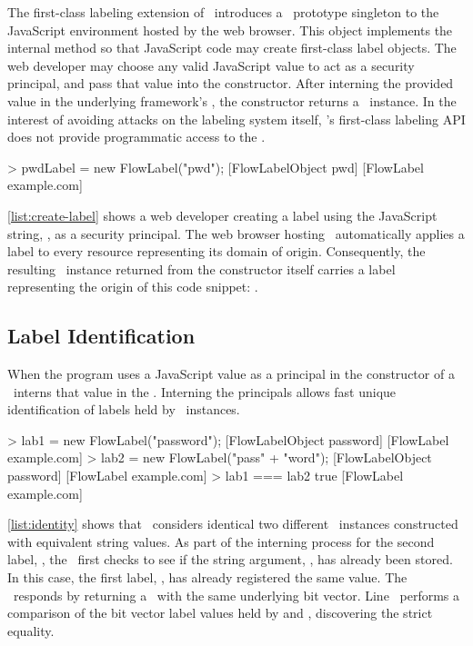 The first-class labeling extension of \FlowCore\ introduces a \FlowLabel\ prototype singleton to the JavaScript environment hosted by the web browser.
This object implements the internal  method so that JavaScript code may create first-class label objects.
The web developer may choose any valid JavaScript value to act as a security principal, and pass that value into the constructor.
After interning the provided value in the underlying framework's \FlowLabelRegistry, the constructor returns a \FlowLabelObject\ instance.
In the interest of avoiding attacks on the labeling system itself, \FlowCore's first-class labeling API does not provide programmatic access to the \FlowLabelRegistry.


\begin{jscode}
> pwdLabel = new FlowLabel("pwd");
  [FlowLabelObject pwd] [FlowLabel example.com]
\end{jscode}

\autoref{list:create-label} shows a web developer creating a label using the JavaScript string, , as a security principal.
The web browser hosting \FlowCore\ automatically applies a label to every resource representing its domain of origin.
Consequently, the resulting \FlowLabelObject\ instance returned from the constructor itself carries a label representing the origin of this code snippet: .

\subsection{Label Identification}

When the program uses a JavaScript value as a principal in the constructor of a \FlowLabelObject\, \FlowCore\ interns that value in the \FlowLabelRegistry.
Interning the principals allows fast unique identification of labels held by \FlowLabelObject\ instances.

\begin{jscode}
> lab1 = new FlowLabel("password");
  [FlowLabelObject password] [FlowLabel example.com]
> lab2 = new FlowLabel("pass" + "word");
  [FlowLabelObject password] [FlowLabel example.com]
> lab1 === lab2
  true [FlowLabel example.com]
\end{jscode}


\autoref{list:identity} shows that \FlowCore\ considers identical two different \FlowLabelObject\ instances constructed with equivalent string values.
As part of the interning process for the second label, , the \FlowLabelRegistry\ first checks to see if the string argument, , has already been stored.
In this case, the first label, , has already registered the same value.
The \FlowLabelRegistry\ responds by returning a \FlowLabelObject\ with the same underlying bit vector.
Line~ performs a comparison of the bit vector label values held by  and , discovering the strict equality.

